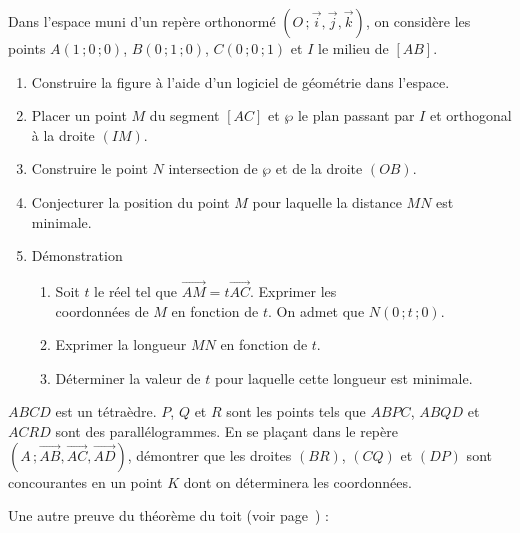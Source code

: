 \begin{colonne*exercice}
  \begin{exercice}[][\tice]
    Dans l'espace muni d'un repère orthonormé
    $(O\,;\vec{i},\vec{j},\vec{k})$, on considère les points
    $A(1\,;0\,;0)$, $B(0\,;1\,;0)$, $C(0\,;0\,;1)$ et $I$ le milieu de
    $[AB]$.
    \begin{enumerate}
    \item Construire la figure à l'aide d'un logiciel de géométrie dans
      l'espace.
    \item Placer un point $M$ du segment $[AC]$ et $\wp$ le plan passant
      par $I$ et orthogonal à la droite $(IM)$.
    \item Construire le point $N$ intersection de $\wp$ et de la droite
      $(OB)$.
    \item Conjecturer la position du point $M$ pour laquelle la distance
      $MN$ est minimale.
    \item Démonstration
      \begin{enumerate}
      \item Soit $t$ le réel tel que
        $\overrightarrow{AM}=t\overrightarrow{AC}$. Exprimer les\\
        coordonnées de $M$ en fonction de $t$. On admet que $N(0\,;t\,;0)$.
      \item Exprimer la longueur $MN$ en fonction de $t$.
      \item Déterminer la valeur de $t$ pour laquelle cette longueur est
        minimale.
      \end{enumerate}
    \end{enumerate}
  \end{exercice}

  \begin{exercice}
    $ABCD$ est un tétraèdre. $P$, $Q$ et $R$ sont les points tels que
    $ABPC$, $ABQD$ et $ACRD$ sont des parallélogrammes.  En se plaçant
    dans le repère
    $(A\,;\overrightarrow{AB},\overrightarrow{AC},\overrightarrow{AD})$,
    démontrer que les droites $(BR)$, $(CQ)$ et $(DP)$ sont
    concourantes en un point $K$ dont on déterminera les coordonnées.
  \end{exercice}

  \begin{exercice}\label{ex71G2}
    Une autre preuve du théorème du toit (voir page~\pageref{G2theoremedutoit}) :

    \begin{center}
      
    \end{center}


\end{exercice}
\end{colonne*exercice}
